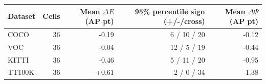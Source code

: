 \begin{tabular}{lrrrr}
\toprule
Dataset & Cells & Mean $\Delta E$ (AP pt) & 95\% percentile sign (+/-/cross) & Mean $\Delta\Psi$ (AP pt) \\
\midrule
COCO & 36 & -0.19 & 6 / 10 / 20 & -0.12 \\
VOC & 36 & -0.04 & 12 / 5 / 19 & -0.44 \\
KITTI & 36 & -0.46 & 5 / 11 / 20 & -0.95 \\
TT100K & 36 & +0.61 & 2 / 0 / 34 & -1.38 \\
\bottomrule
\end{tabular}
